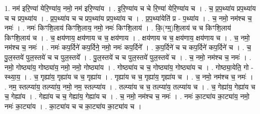 \documentclass[17pt]{extarticle}
\begin{document}
1. नम॑ इरि॒ण्या॑ येरि॒ण्या॑य॒ नमो॒ नम॑ इरि॒ण्या॑य । . इ॒रि॒ण्या॑य च चे रि॒ण्या॑ येरि॒ण्या॑य च । . च॒ प्र॒प॒थ्या॑य प्रप॒थ्या॑य च च प्रप॒थ्या॑य । . प्र॒प॒थ्या॑य च च प्रप॒थ्या॑य प्रप॒थ्या॑य च । . प्र॒प॒थ्या॑येति॑ प्र - प॒थ्या॑य । . च॒ नमो॒ नम॑श्च च॒ नमः॑ । . नमः॑ किꣳशि॒लाय॑ किꣳशि॒लाय॒ नमो॒ नमः॑ किꣳशि॒लाय॑ । . कि॒(ग्म्॒)शि॒लाय॑ च च किꣳशि॒लाय॑ किꣳशि॒लाय॑ च । . च॒ क्षय॑णाय॒ क्षय॑णाय च च॒ क्षय॑णाय । . क्षय॑णाय च च॒ क्षय॑णाय॒ क्षय॑णाय च । . च॒ नमो॒ नम॑श्च च॒ नमः॑ । . नमः॑ कप॒र्दिने॑ कप॒र्दिने॒ नमो॒ नमः॑ कप॒र्दिने᳚ । . क॒प॒र्दिने॑ च च कप॒र्दिने॑ कप॒र्दिने॑ च । . च॒ पु॒ल॒स्तये॑ पुल॒स्तये॑ च च पुल॒स्तये᳚ । . पु॒ल॒स्तये॑ च च पुल॒स्तये॑ पुल॒स्तये॑ च । . च॒ नमो॒ नम॑श्च च॒ नमः॑ । . नमो॒ गोष्ठ्या॑य॒ गोष्ठ्या॑य॒ नमो॒ नमो॒ गोष्ठ्या॑य । . गोष्ठ्या॑य च च॒ गोष्ठ्या॑य॒ गोष्ठ्या॑य च । . गोष्ठ्या॒येति॒ गो - स्थ्या॒य॒ । . च॒ गृह्या॑य॒ गृह्या॑य च च॒ गृह्या॑य । . गृह्या॑य च च॒ गृह्या॑य॒ गृह्या॑य च । . च॒ नमो॒ नम॑श्च च॒ नमः॑ । . नम॒ स्तल्प्या॑य॒ तल्प्या॑य॒ नमो॒ नम॒ स्तल्प्या॑य । . तल्प्या॑य च च॒ तल्प्या॑य॒ तल्प्या॑य च । . च॒ गेह्या॑य॒ गेह्या॑य च च॒ गेह्या॑य । . गेह्या॑य च च॒ गेह्या॑य॒ गेह्या॑य च । . च॒ नमो॒ नम॑श्च च॒ नमः॑ । . नमः॑ का॒ट्या॑य का॒ट्या॑य॒ नमो॒ नमः॑ का॒ट्या॑य । . का॒ट्या॑य च च का॒ट्या॑य का॒ट्या॑य च । \newline
\end{document}
